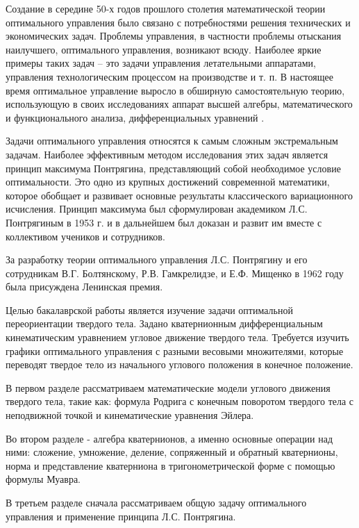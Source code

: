 \documentclass[14pt]{extreport}
\begin{document}


\tableofcontents

\intro

Создание в середине 50-х годов прошлого столетия математической теории оптимального управления было связано с потребностями решения технических и экономических задач. Проблемы управления, в частности проблемы отыскания наилучшего, оптимального управления, возникают всюду. Наиболее яркие примеры таких задач – это задачи управления летательными аппаратами, управления технологическим процессом на производстве и т. п. В настоящее время оптимальное управление выросло в обширную самостоятельную теорию, использующую в своих исследованиях аппарат высшей алгебры, математического и функционального анализа, дифференциальных уравнений \cite{latex}.

Задачи оптимального управления относятся к самым сложным экстремальным задачам. Наиболее эффективным методом исследования этих задач является принцип максимума Понтрягина, представляющий собой необходимое условие оптимальности. Это одно из крупных достижений современной математики, которое обобщает и развивает основные результаты классического вариационного исчисления. Принцип максимума был сформулирован академиком Л.С. Понтрягиным в 1953 г. и в дальнейшем был доказан и развит им вместе с коллективом учеников и сотрудников.

За разработку теории оптимального управления Л.С. Понтрягину и его сотрудникам В.Г. Болтянскому, Р.В. Гамкрелидзе, и Е.Ф. Мищенко в 1962 году была присуждена Ленинская премия.

Целью бакалаврской работы является изучение задачи оптимальной переориентации твердого тела. Задано кватернионным дифференциальным кинематическим уравнением угловое движение твердого тела. Требуется изучить графики оптимального управления с разными весовыми множителями, которые переводят твердое тело из начального углового положения в конечное положение.

В первом разделе рассматриваем математические модели углового движения твердого тела, такие как: формула Родрига с конечным поворотом твердого тела с неподвижной точкой и кинематические уравнения Эйлера.

Во втором разделе - алгебра кватернионов, а именно основные операции над ними: сложение, умножение, деление, сопряженный и обратный кватернионы, норма и представление кватерниона в тригонометрической форме с помощью формулы Муавра.

В третьем разделе сначала рассматриваем общую задачу оптимального управления и применение принципа Л.С. Понтрягина.
\end{document}
